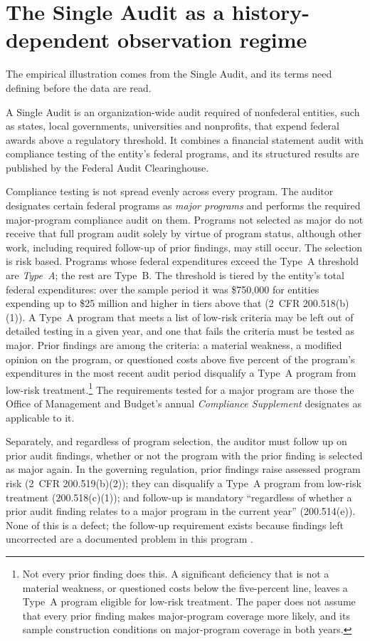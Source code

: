 \section{The Single Audit as a history-dependent observation regime}\label{sec:regime}

The empirical illustration comes from the Single Audit, and its terms need
defining before the data are read.

A Single Audit is an organization-wide audit required of nonfederal entities,
such as states, local governments, universities and nonprofits, that expend
federal awards above a regulatory threshold. It combines a financial statement
audit with compliance testing of the entity's federal programs, and its
structured results are published by the Federal Audit Clearinghouse.

Compliance testing is not spread evenly across every program. The auditor
designates certain federal programs as \emph{major programs} and performs the
required major-program compliance audit on them. Programs not selected as
major do not receive that full program audit solely by virtue of program
status, although other work, including required follow-up of prior findings,
may still occur. The selection is risk based. Programs whose federal
expenditures exceed the Type~A threshold are \emph{Type~A}; the rest are
Type~B. The threshold is tiered by the entity's total federal expenditures:
over the sample period it was \$750,000 for entities expending up to \$25
million and higher in tiers above that (2~CFR 200.518(b)(1)). A Type~A program that meets a list of low-risk criteria may be
left out of detailed testing in a given year, and one that fails the criteria
must be tested as major. Prior findings are among
the criteria: a material weakness, a modified opinion on the program, or
questioned costs above five percent of the program's expenditures in the most
recent audit period disqualify a Type~A program from low-risk
treatment.\footnote{Not every prior finding does this. A significant
deficiency that is not a material weakness, or questioned costs below the
five-percent line, leaves a Type~A program eligible for low-risk treatment.
The paper does not assume that every prior finding makes major-program
coverage more likely, and its sample construction conditions on major-program
coverage in both years.} The
requirements tested for a major program are those the Office of Management and
Budget's annual \emph{Compliance Supplement} designates as applicable to it.

Separately, and regardless of program selection, the auditor must follow up on
prior audit findings, whether or not the program with the prior finding is
selected as major again. In the governing regulation, prior findings raise
assessed program risk (2~CFR 200.519(b)(2)); they can disqualify a Type~A
program from low-risk treatment (200.518(c)(1)); and follow-up is mandatory
``regardless of whether a prior audit finding relates to a major program in
the current year'' (200.514(e)). None of this is a defect; the follow-up requirement exists
because findings left uncorrected are a documented problem in this program
\citep{gao2002}.

